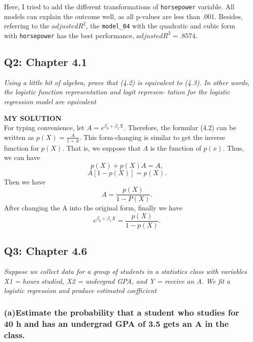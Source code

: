 \documentclass[
]{article}
\begin{document}
Here, I tried to add the different transformations of
\texttt{horsepower} variable. All models can explain the outcome well,
as all p-values are less than .001. Besides, referring to the
\(adjusted R^2\), the \texttt{model\_04} with the quadratic and cubic
form with \texttt{horsepower} has the best performance,
\(adjusted R^2=.8574\).

\hypertarget{q2-chapter-4.1}{%
\subsection{Q2: Chapter 4.1}\label{q2-chapter-4.1}}

\emph{Using a little bit of algebra, prove that (4.2) is equivalent to
(4.3). In other words, the logistic function representation and logit
represen- tation for the logistic regression model are equivalent}

\textbf{MY SOLUTION}\\
For typing convenience, let \(A= e^{\beta_0+\beta_1X}\). Therefore, the
formular (4.2) can be written as \(p(X) = \frac{A}{1+A}\). This
form-changing is similar to get the inverse function for \(p(X)\). That
is, we suppose that \(A\) is the function of \(p(x)\). Thus, we can have
\[p(X) + p(X)A = A,\]\[A[1-p(X)]=p(X).\] Then we have
\[A=\frac{p(X)}{1-P(X)}.\] After changing the A into the original form,
finally we have \[e^{\beta_0+\beta_1X} = \frac{p(X)}{1-p(X)}.\]

\hypertarget{q3-chapter-4.6}{%
\subsection{Q3: Chapter 4.6}\label{q3-chapter-4.6}}

\emph{Suppose we collect data for a group of students in a statistics
class with variables X1 = hours studied, X2 = undergrad GPA, and Y =
receive an A. We fit a logistic regression and produce estimated
coefficient}

\hypertarget{aestimate-the-probability-that-a-student-who-studies-for-40-h-and-has-an-undergrad-gpa-of-3.5-gets-an-a-in-the-class.}{%
\subsubsection{\texorpdfstring{\textbf{(a)Estimate the probability that
a student who studies for 40 h and has an undergrad GPA of 3.5 gets an A
in the
class.}}{(a)Estimate the probability that a student who studies for 40 h and has an undergrad GPA of 3.5 gets an A in the class.}}\label{aestimate-the-probability-that-a-student-who-studies-for-40-h-and-has-an-undergrad-gpa-of-3.5-gets-an-a-in-the-class.}}
\end{document}
